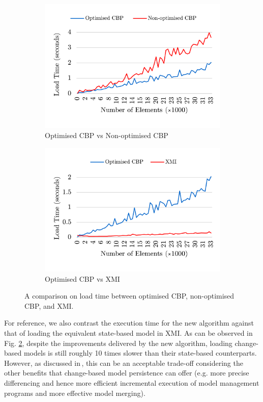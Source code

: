 \documentclass{llncs}
\begin{document}
\begin{figure}[ht]	
    \begin{subfigure}[t]{0.5\linewidth}
		\includegraphics[width=\linewidth]{loading_speed_conf}
		\caption{Optimised CBP vs Non-optimised CBP}\label{fig:loading_speed_conf}
	\end{subfigure}
	\hfill
	\begin{subfigure}[t]{0.5\linewidth}
		\includegraphics[width=\linewidth]{loading_speed_conf_ocbp_xmi}
		\caption{Optimised CBP vs XMI}\label{fig:loading_speed_conf_ocbp_xmi}		
	\end{subfigure}	
	\caption{A comparison on load time between optimised CBP, non-optimised CBP, and XMI.}
	\label{fig:loading_speed}
\end{figure}

For reference, we also contrast the execution time for the new algorithm against that of loading the equivalent state-based model in XMI. As can be observed in Fig. \ref{fig:loading_speed_conf_ocbp_xmi}, despite the improvements delivered by the new algorithm, loading change-based models is still roughly 10 times slower than their state-based counterparts. However, as discussed in\,\cite{yohannis2017turning}, this can be an acceptable trade-off considering the other benefits that change-based model persistence can offer (e.g. more precise differencing and hence more efficient incremental execution of model management programs and more effective model merging).
\end{document}
